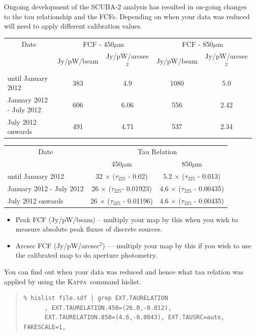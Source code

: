 \documentclass[twoside,11pt]{article}
\newcommand{\xref}[3]{#1}
\renewcommand{\_}{\texttt{\symbol{95}}}
\newenvironment{myquote}{\begin{quote}\begin{small}}{\end{small}\end{quote}}
\newcommand{\Kappa}{\xref{\textsc{Kappa}}{sun95}{}}
\newcommand{\task}[1]{\textsf{#1}}
\newcommand{\hislist}{\xref{\task{hislist}}{sun95}{HISLIST}}
\begin{document}
Ongoing development of the SCUBA-2 analysis has resulted in on-going
changes to the tau relationship and the FCFs. Depending on when your
data was reduced will need to apply different calibration values.
\\
\begin{table}[h!]
\begin{center}
\begin{tabular}{|l|c|c|c|c|}
 \hline
 \multicolumn{1}{|c|}{Date} &
 \multicolumn{2}{c|}{FCF - 450$\mu$m} &
\multicolumn{2}{c|}{FCF - 850$\mu$m} \\
\cline{2-5}
& Jy/pW/beam &Jy/pW/arcsec$^2$ & Jy/pW/beam &Jy/pW/arcsec$^2$ \\
 \hline
until January 2012 &383 & 4.9&1080 &5.0 \\
January 2012 - July 2012&606&6.06 &556 &2.42 \\
July 2012 onwards&491 &4.71 &537 &2.34 \\
\hline
\end{tabular}
\end{center}
\end{table}
\vspace{-2mm}
\begin{table}[h!]
\begin{center}
\begin{tabular}{|l|c|c|}
 \hline
 \multicolumn{1}{|c}{Date} & \multicolumn{2}{|c|}{Tau Relation} \\ \cline{2-3}
                           & 450$\mu$m & 850$\mu$m \\ \hline
until January 2012 & 32 $\times$ ($\tau_{225}$ - 0.02) & 5.2 $\times$ ($\tau_{225}$ - 0.013) \\
January 2012 - July 2012 & 26 $\times$ ($\tau_{225}$- 0.01923) & 4.6 $\times$ ($\tau_{225}$ - 0.00435) \\
July 2012 onwards & 26 $\times$ ($\tau_{225}$ - 0.01196) & 4.6 $\times$ ($\tau_{225}$ - 0.00435) \\
\hline
\end{tabular}
\end{center}
\end{table}

\vspace{-5mm}
\begin{itemize}
\item Peak FCF (Jy/pW/beam) -- multiply your map by this when you wish
to measure absolute peak fluxes of discrete sources.
\item Arcsec FCF (Jy/pW/arcsec$^2$) --- multiply your map by this if
you wish to use the calibrated map to do aperture photometry.
\end{itemize}
You can find out when your data was reduced and hence what tau
relation was applied by using the \Kappa\ command \hislist.
\vspace{-2mm}
\begin{myquote}
\begin{verbatim}
% hislist file.sdf | grep EXT.TAURELATION
      , EXT.TAURELATION.450=(26.0,-0.012),
      EXT.TAURELATION.850=(4.6,-0.0043), EXT.TAUSRC=auto, FAKESCALE=1,
\end{verbatim}
\end{myquote}
\end{document}
